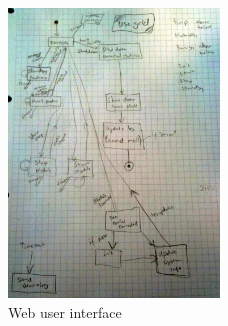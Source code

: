 			\begin{figure}[h!]		%
				\begin{centering}
					 \includegraphics[width=0.5\textwidth]{images/statemachine.JPG}
		 			\caption{Web user interface}
			 	\end{centering}
			\end{figure}

